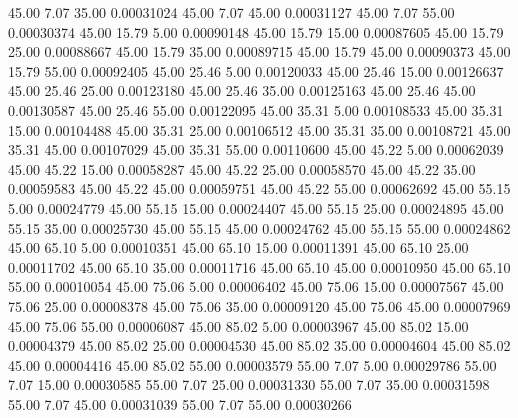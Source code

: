      45.00      7.07     35.00     0.00031024
     45.00      7.07     45.00     0.00031127
     45.00      7.07     55.00     0.00030374
     45.00     15.79      5.00     0.00090148
     45.00     15.79     15.00     0.00087605
     45.00     15.79     25.00     0.00088667
     45.00     15.79     35.00     0.00089715
     45.00     15.79     45.00     0.00090373
     45.00     15.79     55.00     0.00092405
     45.00     25.46      5.00     0.00120033
     45.00     25.46     15.00     0.00126637
     45.00     25.46     25.00     0.00123180
     45.00     25.46     35.00     0.00125163
     45.00     25.46     45.00     0.00130587
     45.00     25.46     55.00     0.00122095
     45.00     35.31      5.00     0.00108533
     45.00     35.31     15.00     0.00104488
     45.00     35.31     25.00     0.00106512
     45.00     35.31     35.00     0.00108721
     45.00     35.31     45.00     0.00107029
     45.00     35.31     55.00     0.00110600
     45.00     45.22      5.00     0.00062039
     45.00     45.22     15.00     0.00058287
     45.00     45.22     25.00     0.00058570
     45.00     45.22     35.00     0.00059583
     45.00     45.22     45.00     0.00059751
     45.00     45.22     55.00     0.00062692
     45.00     55.15      5.00     0.00024779
     45.00     55.15     15.00     0.00024407
     45.00     55.15     25.00     0.00024895
     45.00     55.15     35.00     0.00025730
     45.00     55.15     45.00     0.00024762
     45.00     55.15     55.00     0.00024862
     45.00     65.10      5.00     0.00010351
     45.00     65.10     15.00     0.00011391
     45.00     65.10     25.00     0.00011702
     45.00     65.10     35.00     0.00011716
     45.00     65.10     45.00     0.00010950
     45.00     65.10     55.00     0.00010054
     45.00     75.06      5.00     0.00006402
     45.00     75.06     15.00     0.00007567
     45.00     75.06     25.00     0.00008378
     45.00     75.06     35.00     0.00009120
     45.00     75.06     45.00     0.00007969
     45.00     75.06     55.00     0.00006087
     45.00     85.02      5.00     0.00003967
     45.00     85.02     15.00     0.00004379
     45.00     85.02     25.00     0.00004530
     45.00     85.02     35.00     0.00004604
     45.00     85.02     45.00     0.00004416
     45.00     85.02     55.00     0.00003579
     55.00      7.07      5.00     0.00029786
     55.00      7.07     15.00     0.00030585
     55.00      7.07     25.00     0.00031330
     55.00      7.07     35.00     0.00031598
     55.00      7.07     45.00     0.00031039
     55.00      7.07     55.00     0.00030266
